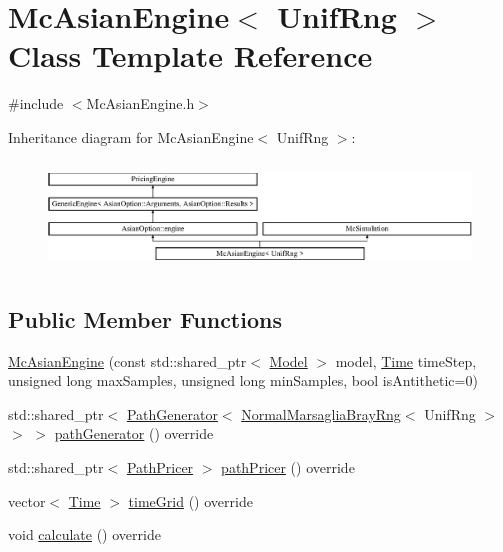 \hypertarget{class_mc_asian_engine}{}\section{Mc\+Asian\+Engine$<$ Unif\+Rng $>$ Class Template Reference}
\label{class_mc_asian_engine}


{\ttfamily \#include $<$Mc\+Asian\+Engine.\+h$>$}

Inheritance diagram for Mc\+Asian\+Engine$<$ Unif\+Rng $>$\+:\begin{figure}[H]
\begin{center}
\leavevmode
\includegraphics[height=2.894057cm]{class_mc_asian_engine}
\end{center}
\end{figure}
\subsection*{Public Member Functions}
\begin{DoxyCompactItemize}
\item 
\hyperlink{class_mc_asian_engine_a8688d15638d6176095dab92ef31ad3ad}{Mc\+Asian\+Engine} (const std\+::shared\+\_\+ptr$<$ \hyperlink{class_model}{Model} $>$ model, \hyperlink{_name_def_8h_ac2d3e0ba793497bcca555c7c2cf64ff3}{Time} time\+Step, unsigned long max\+Samples, unsigned long min\+Samples, bool is\+Antithetic=0)
\item 
std\+::shared\+\_\+ptr$<$ \hyperlink{class_path_generator}{Path\+Generator}$<$ \hyperlink{class_normal_marsaglia_bray_rng}{Normal\+Marsaglia\+Bray\+Rng}$<$ Unif\+Rng $>$ $>$ $>$ \hyperlink{class_mc_asian_engine_a93c9216b38bcbe0fe7e8131bf975dbc2}{path\+Generator} () override
\item 
std\+::shared\+\_\+ptr$<$ \hyperlink{class_path_pricer}{Path\+Pricer} $>$ \hyperlink{class_mc_asian_engine_afb903df1f8e0023a1f6bfae43ccbc8f7}{path\+Pricer} () override
\item 
vector$<$ \hyperlink{_name_def_8h_ac2d3e0ba793497bcca555c7c2cf64ff3}{Time} $>$ \hyperlink{class_mc_asian_engine_a4c16366e8dec7d689e934cbafe413332}{time\+Grid} () override
\item 
void \hyperlink{class_mc_asian_engine_a4e67149307de395f821c8aa07afad3b8}{calculate} () override
\end{DoxyCompactItemize}
